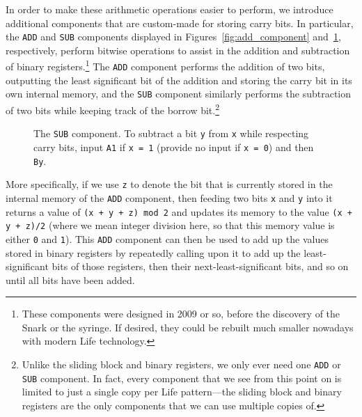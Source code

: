 In order to make these arithmetic operations easier to perform, we introduce additional components that are custom-made for storing carry bits. In particular, the \texttt{ADD} and \texttt{SUB} components displayed in Figures~\ref{fig:add_component} and~\ref{fig:sub_component}, respectively, perform bitwise operations to assist in the addition and subtraction of binary registers.\footnote{These components were designed in 2009 or so, before the discovery of the Snark or the syringe. If desired, they could be rebuilt much smaller nowadays with modern Life technology.} The \texttt{ADD} component performs the addition of two bits, outputting the least significant bit of the addition and storing the carry bit in its own internal memory, and the \texttt{SUB} component similarly performs the subtraction of two bits while keeping track of the borrow bit.\footnote{Unlike the sliding block and binary registers, we only ever need one \texttt{ADD} or \texttt{SUB} component. In fact, every component that we see from this point on is limited to just a single copy per Life pattern---the sliding block and binary registers are the only components that we can use multiple copies of.}

\begin{figure}[!htb]
	\centering
	\begin{minipage}[t]{0.48\textwidth}
		\centering
		\caption{The \texttt{ADD} component. To add up two bits \texttt{x} and \texttt{y} while respecting carry bits, input \texttt{A1} if \texttt{x = 1} (provide no input if \texttt{x = 0}) and then \texttt{By}.}\label{fig:add_component}
	\end{minipage}\hfill
	\begin{minipage}[t]{0.48\textwidth}
		\centering
		\caption{The \texttt{SUB} component. To subtract a bit \texttt{y} from \texttt{x} while respecting carry bits, input \texttt{A1} if \texttt{x = 1} (provide no input if \texttt{x = 0}) and then \texttt{By}.}\label{fig:sub_component}
	\end{minipage}
\end{figure}

More specifically, if we use \texttt{z} to denote the bit that is currently stored in the internal memory of the \texttt{ADD} component, then feeding two bits \texttt{x} and \texttt{y} into it returns a value of \texttt{(x + y + z) mod 2} and updates its memory to the value \texttt{(x + y + z)/2} (where we mean integer division here, so that this memory value is either \texttt{0} and \texttt{1}). This \texttt{ADD} component can then be used to add up the values stored in binary registers by repeatedly calling upon it to add up the least-significant bits of those registers, then their next-least-significant bits, and so on until all bits have been added.

